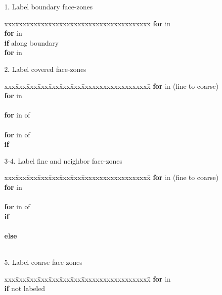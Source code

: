 \documentclass[10pt]{article}
\begin{document}
\begin{itemize}
\item[1.] Label boundary face-zones
\begin{tabbing}
xxx\=xxx\=xxx\=xxx\=xxx\=xxx\=xxx\=xxxxxxxxxxxxxxxxxxx\=\kill
\> \textbf{for}  in  \\
\>\> \textbf{for}  in  \\
\>\>\> \textbf{if}  along boundary \\
\>\>\>\> \textbf{for}  in  \\
\>\>\>\>\> 
\end{tabbing}
\item[2.] Label covered face-zones
\begin{tabbing}
xxx\=xxx\=xxx\=xxx\=xxx\=xxx\=xxx\=xxxxxxxxxxxxxxxxxxx\=\kill
\> \textbf{for}  in  (fine to coarse) \\
\>\> \textbf{for}  in  \\
\>\>\>  \\
\>\>\>\> \textbf{for}  in  of \\
\>\>\>\>\>      \\
\>\>\>\> \textbf{for}  in  of \\
\>\>\>\>\>     \textbf{if}  \\
\>\>\>\>\>\> 
\end{tabbing}
\item[3-4.] Label fine and neighbor face-zones
\begin{tabbing}
xxx\=xxx\=xxx\=xxx\=xxx\=xxx\=xxx\=xxxxxxxxxxxxxxxxxxx\=\kill
\> \textbf{for}  in  (fine to coarse) \\
\>\> \textbf{for}  in  \\
\>\>\>  \\
\>\>\>\> \textbf{for}  in  of \\
\>\>\>\>\> \textbf{if}  \\
\>\>\>\>\>\>  \\
\>\>\>\>\> \textbf{else} \\
\>\>\>\>\>\>  \\
\end{tabbing}
\item[5.] Label coarse face-zones
\begin{tabbing}
xxx\=xxx\=xxx\=xxx\=xxx\=xxx\=xxx\=xxxxxxxxxxxxxxxxxxx\=\kill
\> \textbf{for}  in  \\
\>\> \textbf{if}  not labeled \\
\>\>\>        
\end{tabbing}
\end{itemize}
\end{document}
